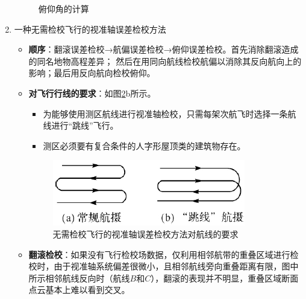 \begin{enumerate}
\begin{figure}[htbp]
			\caption{俯仰角的计算}
			\label{fig:俯仰角的计算}
		\end{figure}
	\item {\cukai 一种无需检校飞行的视准轴误差检校方法}
		\begin{itemize}
			\item \textbf{顺序}：翻滚误差检校→航偏误差检校→俯仰误差检校。首先消除翻滚造成的同名地物高程差异； 然后在用同向航线检校航偏以消除其反向航向上的影响；最后用反向航向检校俯仰。
			\item \textbf{对飞行行线的要求}：如图\ref{fig:无需检校飞行的视准轴误差检校方法对航线的要求}b所示。
				\begin{itemize}
					\item 为能够使用测区航线进行视准轴检校，只需每架次航飞时选择一条航线进行“跳线”飞行。
					\item 测区必须要有复合条件的人字形屋顶类的建筑物存在。
				\end{itemize}
				\begin{figure}[htbp]
					\centering
					\includegraphics[width=0.3\linewidth]{figure/Chapter8/无需检校飞行的视准轴误差检校方法对航线的要求}
					\caption{无需检校飞行的视准轴误差检校方法对航线的要求}
					\label{fig:无需检校飞行的视准轴误差检校方法对航线的要求}
				\end{figure}
			\item \textbf{翻滚检校}：如果没有飞行检校场数据，仅利用相邻航带的重叠区域进行检校时，由于视准轴系统偏差很微小，且相邻航线旁向重叠距离有限，图中所示相邻航线反向时（航线$ B $和$ C $），翻滚的表现并不明显，重叠区域断面点云基本上难以看到交叉。
			

\end{itemize}
\end{enumerate}
